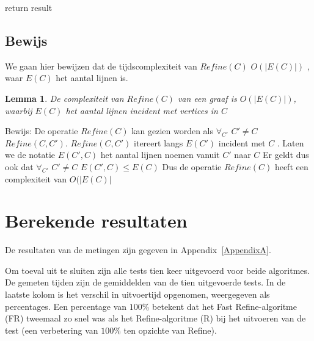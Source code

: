 \documentclass[twoside]{article}
\newtheorem{lemma}[theorem]{Lemma}
\begin{document}
\begin{multicols}{2}
\begin{algorithm}[H]
return result
 
\caption{$ generate\_dcount $}

\end{algorithm}




\subsection{Bewijs}

We gaan hier bewijzen dat de tijdscomplexiteit van  $ Refine(C) $ $ O(|E(C)|)$ ,  waar $ E(C) $ het aantal lijnen is.

\begin{lemma}
De complexiteit van $Refine(C)$ van een graaf is $O(|E(C)|) $,  waarbij  $ E(C)$ het aantal lijnen incident met vertices in $C$
\end{lemma}

Bewijs:
De operatie $ Refine(C) $ kan gezien worden als $ \forall_{C'} $  $ C' \neq C $ $ Refine(C, C') $. $Refine(C, C') $ itereert langs $ E(C') $  incident met $ C$ . 
Laten we de notatie $ E(C', C) $ het aantal lijnen noemen vanuit $ C' $ naar $ C $
Er geldt dus ook dat $ \forall_{C'}  $  $ C' \neq C $  $ E(C', C) \leqslant E(C) $
Dus de operatie $ Refine(C) $ heeft een complexiteit van $O(|E(C)|$ 



\section{Berekende resultaten}

De resultaten van de metingen zijn gegeven in Appendix~\ref{AppendixA}.

Om toeval uit te sluiten zijn alle tests tien keer uitgevoerd voor beide algoritmes. De gemeten tijden zijn de gemiddelden van de tien uitgevoerde tests. In de laatste kolom is het verschil in uitvoertijd opgenomen, weergegeven als percentages. Een percentage van $100$\% betekent dat het Fast Refine-algoritme (FR) tweemaal zo snel was als het Refine-algoritme (R) bij het uitvoeren van de test (een verbetering van $100$\% ten opzichte van Refine).


\end{multicols}
\end{document}
